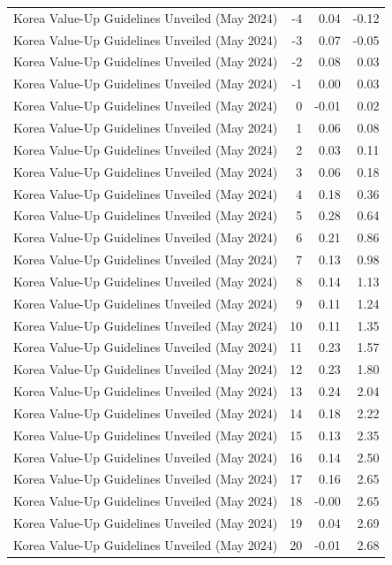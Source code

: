 \begin{table}
\begin{tabular}{lrrr}
Korea Value-Up Guidelines Unveiled (May 2024) & -4 & 0.04 & -0.12 \\
Korea Value-Up Guidelines Unveiled (May 2024) & -3 & 0.07 & -0.05 \\
Korea Value-Up Guidelines Unveiled (May 2024) & -2 & 0.08 & 0.03 \\
Korea Value-Up Guidelines Unveiled (May 2024) & -1 & 0.00 & 0.03 \\
Korea Value-Up Guidelines Unveiled (May 2024) & 0 & -0.01 & 0.02 \\
Korea Value-Up Guidelines Unveiled (May 2024) & 1 & 0.06 & 0.08 \\
Korea Value-Up Guidelines Unveiled (May 2024) & 2 & 0.03 & 0.11 \\
Korea Value-Up Guidelines Unveiled (May 2024) & 3 & 0.06 & 0.18 \\
Korea Value-Up Guidelines Unveiled (May 2024) & 4 & 0.18 & 0.36 \\
Korea Value-Up Guidelines Unveiled (May 2024) & 5 & 0.28 & 0.64 \\
Korea Value-Up Guidelines Unveiled (May 2024) & 6 & 0.21 & 0.86 \\
Korea Value-Up Guidelines Unveiled (May 2024) & 7 & 0.13 & 0.98 \\
Korea Value-Up Guidelines Unveiled (May 2024) & 8 & 0.14 & 1.13 \\
Korea Value-Up Guidelines Unveiled (May 2024) & 9 & 0.11 & 1.24 \\
Korea Value-Up Guidelines Unveiled (May 2024) & 10 & 0.11 & 1.35 \\
Korea Value-Up Guidelines Unveiled (May 2024) & 11 & 0.23 & 1.57 \\
Korea Value-Up Guidelines Unveiled (May 2024) & 12 & 0.23 & 1.80 \\
Korea Value-Up Guidelines Unveiled (May 2024) & 13 & 0.24 & 2.04 \\
Korea Value-Up Guidelines Unveiled (May 2024) & 14 & 0.18 & 2.22 \\
Korea Value-Up Guidelines Unveiled (May 2024) & 15 & 0.13 & 2.35 \\
Korea Value-Up Guidelines Unveiled (May 2024) & 16 & 0.14 & 2.50 \\
Korea Value-Up Guidelines Unveiled (May 2024) & 17 & 0.16 & 2.65 \\
Korea Value-Up Guidelines Unveiled (May 2024) & 18 & -0.00 & 2.65 \\
Korea Value-Up Guidelines Unveiled (May 2024) & 19 & 0.04 & 2.69 \\
Korea Value-Up Guidelines Unveiled (May 2024) & 20 & -0.01 & 2.68 \\

\end{tabular}
\end{table}
